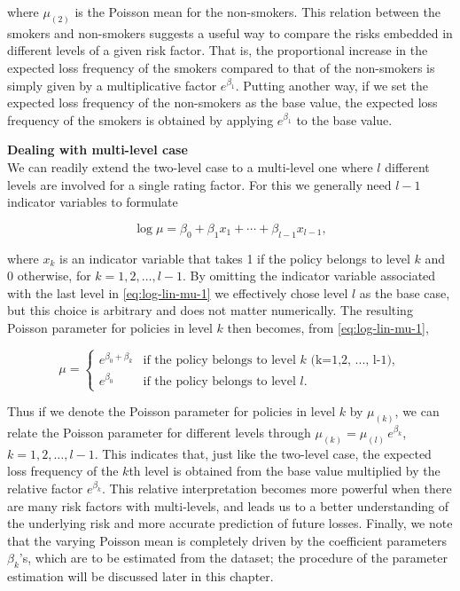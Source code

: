 \documentclass[]{book}
\theoremstyle{definition}
\theoremstyle{definition}
\theoremstyle{definition}
\theoremstyle{remark}
\begin{document}
where \(\mu_{(2)}\) is the Poisson mean for the non-smokers. This
relation between the smokers and non-smokers suggests a useful way to
compare the risks embedded in different levels of a given risk factor.
That is, the proportional increase in the expected loss frequency of the
smokers compared to that of the non-smokers is simply given by a
multiplicative factor \(e^{\beta_1}\). Putting another way, if we set
the expected loss frequency of the non-smokers as the base value, the
expected loss frequency of the smokers is obtained by applying
\(e^{\beta_1}\) to the base value.

\textbf{Dealing with multi-level case}\\
We can readily extend the two-level case to a multi-level one where
\(l\) different levels are involved for a single rating factor. For this
we generally need \(l-1\) indicator variables to formulate

\begin{equation}
\log \mu=\beta_0+\beta_1 x_1+\cdots+\beta_{l-1} x_{l-1},
\label{eq:log-lin-mu-1}
\end{equation}

where \(x_k\) is an indicator variable that takes 1 if the policy
belongs to level \(k\) and 0 otherwise, for \(k=1,2, \ldots, l-1\). By
omitting the indicator variable associated with the last level in
\eqref{eq:log-lin-mu-1} we effectively chose level \(l\) as the base case,
but this choice is arbitrary and does not matter numerically. The
resulting Poisson parameter for policies in level \(k\) then becomes,
from \eqref{eq:log-lin-mu-1},

\begin{equation}
\nonumber
\mu= \begin{cases}
     e^{\beta_0+\beta_k} & \text{if the policy belongs to level $k$ (k=1,2, ..., l-1)}, \\
     e^{\beta_0} & \text{if the policy belongs to level $l$}.
\end{cases}
\end{equation}

Thus if we denote the Poisson parameter for policies in level \(k\) by
\(\mu_{(k)}\), we can relate the Poisson parameter for different levels
through \(\mu_{(k)}=\mu_{(l)}\, e^{\beta_k}\), \(k=1,2, \ldots, l-1\).
This indicates that, just like the two-level case, the expected loss
frequency of the \(k\)th level is obtained from the base value
multiplied by the relative factor \(e^{\beta_k}\). This relative
interpretation becomes more powerful when there are many risk factors
with multi-levels, and leads us to a better understanding of the
underlying risk and more accurate prediction of future losses. Finally,
we note that the varying Poisson mean is completely driven by the
coefficient parameters \(\beta_k\)'s, which are to be estimated from the
dataset; the procedure of the parameter estimation will be discussed
later in this chapter.
\end{document}
